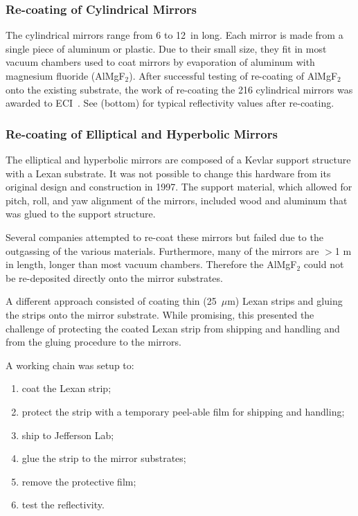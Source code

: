 \subsubsection{Re-coating of Cylindrical Mirrors}

The cylindrical mirrors range from 6 to 12~in long. Each mirror is made from a single piece of aluminum or plastic.
Due to their small size, they fit in most vacuum chambers used to coat mirrors by evaporation of aluminum with magnesium fluoride
(AlMgF$_2$). After successful testing of re-coating of AlMgF$_2$ onto the existing substrate, the work of re-coating the 216 cylindrical mirrors
was awarded to ECI~\cite{ECI}. See  (bottom) for typical reflectivity values after re-coating.

\subsubsection{Re-coating of Elliptical and Hyperbolic Mirrors}

The elliptical and hyperbolic mirrors are composed of a Kevlar support structure with a Lexan substrate.
It was not possible to change this hardware from its original design and construction in 1997.
The support material, which allowed for pitch, roll, and yaw alignment of the mirrors, included
wood and aluminum that was glued to the support structure.

Several companies attempted to re-coat these mirrors but failed due to the outgassing of the various materials.
Furthermore, many of the mirrors are $>$1 m in length, longer than most vacuum chambers.
Therefore the AlMgF$_2$ could not be re-deposited directly onto the mirror substrates.

A different approach consisted of coating thin (25~$\mu$m) Lexan strips and gluing the strips onto the mirror substrate.
While promising, this presented the challenge of protecting the coated Lexan strip from shipping and handling and
from the gluing procedure to the mirrors.

A working chain was setup to:

\begin{enumerate}
	\item coat the Lexan strip;
	\item protect the strip with a temporary peel-able film for shipping and handling;
	\item ship to Jefferson Lab;
	\item glue the strip to the mirror substrates;
	\item remove the protective film;
	\item test the reflectivity.
\end{enumerate}

